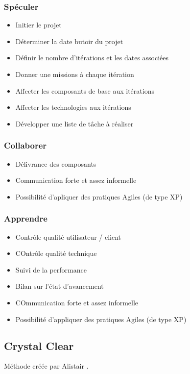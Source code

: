 	\subsubsection{Spéculer}
	\begin{itemize}
		\item Initier le projet
		\item Déterminer la date butoir du projet
		\item Définir le nombre d'itérations et les dates associées
		\item Donner une missions à chaque itération
		\item Affecter les composants de base aux itérations
		\item Affecter les technologies aux itérations
		\item Développer une liste de tâche à réaliser
	\end{itemize}
	\subsubsection{Collaborer}
	\begin{itemize}
		\item Délivrance des composants
		\item Communication forte et assez informelle
		\item Possibilité d'apliquer des pratiques Agiles (de type XP)
	\end{itemize}
	\subsubsection{Apprendre}
	\begin{itemize}
		\item Contrôle qualité utilisateur / client
		\item COntrôle qualité technique
		\item Suivi de la performance
		\item Bilan sur l'état d'avancement
		\item COmmunication forte et assez informelle
		\item Possibilité d'appliquer des pratiques Agiles (de type XP)
	\end{itemize}
	\subsection{Crystal Clear}
	Méthode créée par Alistair .
